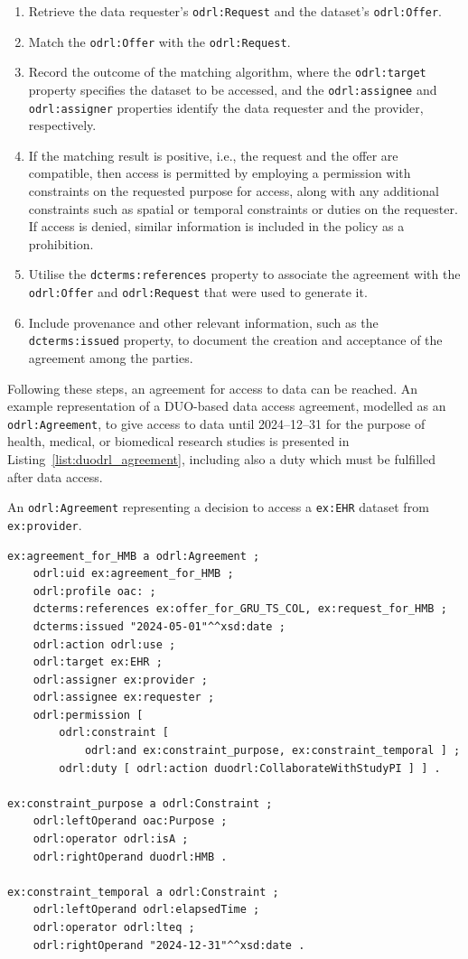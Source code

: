 \begin{enumerate}
    \item Retrieve the data requester's \texttt{odrl:Request} and the dataset's \texttt{odrl:Offer}.
    \item Match the \texttt{odrl:Offer} with the \texttt{odrl:Request}.
    \item Record the outcome of the matching algorithm, where the \texttt{odrl:target} property specifies the dataset to be accessed, and the \texttt{odrl:assignee} and \texttt{odrl:assigner} properties identify the data requester and the provider, respectively.
    \item If the matching result is positive, i.e., the request and the offer are compatible, then access is permitted by employing a permission with constraints on the requested purpose for access, along with any additional constraints such as spatial or temporal constraints or duties on the requester. If access is denied, similar information is included in the policy as a prohibition.
    \item Utilise the \texttt{dcterms:references} property to associate the agreement with the \texttt{odrl:Offer} and \texttt{odrl:Request} that were used to generate it.
    \item Include provenance and other relevant information, such as the \texttt{dcterms:issued} property, to document the creation and acceptance of the agreement among the parties.
\end{enumerate}

Following these steps, an agreement for access to data can be reached.
An example representation of a DUO-based data access agreement, modelled as an \texttt{odrl:Agreement}, to give access to data until 2024--12--31 for the purpose of health, medical, or biomedical research studies is presented in Listing~\ref{list:duodrl_agreement}, including also a duty which must be fulfilled after data access.

\begin{listing}[htp]
\caption{An \texttt{odrl:Agreement} representing a decision to access a \texttt{ex:EHR} dataset from \texttt{ex:provider}.}
\label{list:duodrl_agreement}
\begin{verbatim}
ex:agreement_for_HMB a odrl:Agreement ;
    odrl:uid ex:agreement_for_HMB ;
    odrl:profile oac: ;
    dcterms:references ex:offer_for_GRU_TS_COL, ex:request_for_HMB ;
    dcterms:issued "2024-05-01"^^xsd:date ;
    odrl:action odrl:use ;
    odrl:target ex:EHR ;
    odrl:assigner ex:provider ;
    odrl:assignee ex:requester ;
    odrl:permission [
        odrl:constraint [
            odrl:and ex:constraint_purpose, ex:constraint_temporal ] ;
        odrl:duty [ odrl:action duodrl:CollaborateWithStudyPI ] ] .

ex:constraint_purpose a odrl:Constraint ;
    odrl:leftOperand oac:Purpose ;
    odrl:operator odrl:isA ;
    odrl:rightOperand duodrl:HMB .

ex:constraint_temporal a odrl:Constraint ;
    odrl:leftOperand odrl:elapsedTime ;
    odrl:operator odrl:lteq ;
    odrl:rightOperand "2024-12-31"^^xsd:date .
\end{verbatim}
\end{listing}

